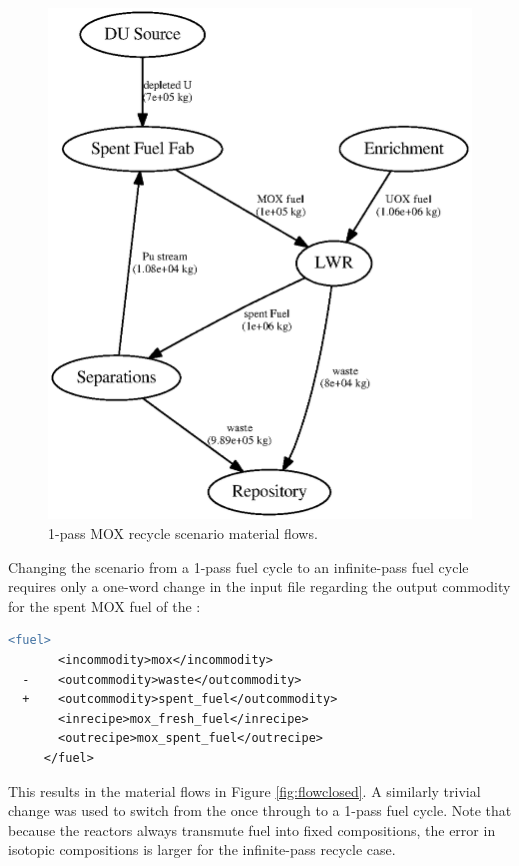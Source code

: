 \begin{figure}[H]
\begin{center}
\includegraphics{./images/flow-mod-open-1.eps}
\end{center}
\caption{1-pass \gls{MOX} recycle scenario material flows.}
\label{fig:flowmodopen}
\end{figure}

Changing the scenario from a 1-pass fuel cycle to an infinite-pass fuel cycle
requires only a one-word change in the input file regarding the output
commodity for the spent \gls{MOX} fuel of the :

\begin{lstlisting}[language=diff]
     <fuel>
       <incommodity>mox</incommodity>
  -    <outcommodity>waste</outcommodity>
  +    <outcommodity>spent_fuel</outcommodity>
       <inrecipe>mox_fresh_fuel</inrecipe>
       <outrecipe>mox_spent_fuel</outrecipe>
     </fuel>
\end{lstlisting}

This results in the material flows in Figure \ref{fig:flowclosed}.  A
similarly trivial change was used to switch from the once through to a 1-pass
fuel cycle.  Note that because the reactors always transmute fuel into fixed
compositions, the error in isotopic compositions is larger for the
infinite-pass recycle case.

